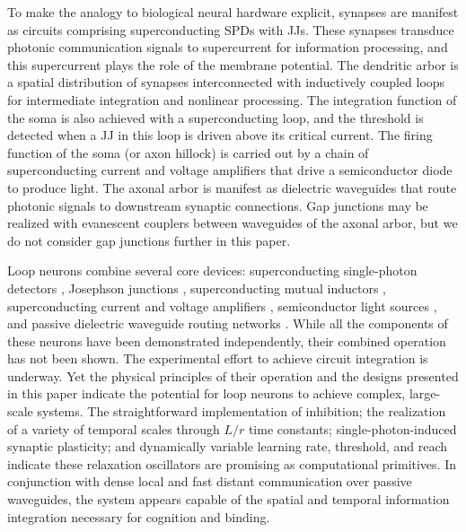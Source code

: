 \documentclass[aip,amsmath,amssymb,reprint,nofootinbib]{revtex4-1}
\begin{document}
To make the analogy to biological neural hardware explicit, synapses are manifest as circuits comprising superconducting SPDs with JJs. These synapses transduce photonic communication signals to supercurrent for information processing, and this supercurrent plays the role of the membrane potential. The dendritic arbor is a spatial distribution of synapses interconnected with inductively coupled loops for intermediate integration and nonlinear processing. The integration function of the soma is also achieved with a superconducting loop, and the threshold is detected when a JJ in this loop is driven above its critical current. The firing function of the soma (or axon hillock) is carried out by a chain of superconducting current and voltage amplifiers that drive a semiconductor diode to produce light. The axonal arbor is manifest as dielectric waveguides that route photonic signals to downstream synaptic connections. Gap junctions may be realized with evanescent couplers between waveguides of the axonal arbor, but we do not consider gap junctions further in this paper.

Loop neurons combine several core devices: superconducting single-photon detectors \cite{gook2001,nata2012,liyo2013,mave2013}, Josephson junctions \cite{ti1996,vatu1998,ka1999}, superconducting mutual inductors \cite{miha2005}, superconducting current \cite{mcbe2014,mcab2016} and voltage amplifiers \cite{zhto2018}, semiconductor light sources \cite{shbu2017,buch2017}, and passive dielectric waveguide routing networks \cite{chbu2017,sami2017,chbu2018}. While all the components of these neurons have been demonstrated independently, their combined operation has not been shown. The experimental effort to achieve circuit integration is underway. Yet the physical principles of their operation and the designs presented in this paper indicate the potential for loop neurons to achieve complex, large-scale systems. The straightforward implementation of inhibition; the realization of a variety of temporal scales through $L/r$ time constants; single-photon-induced synaptic plasticity; and dynamically variable learning rate, threshold, and reach indicate these relaxation oscillators are promising as computational primitives. In conjunction with dense local and fast distant communication over passive waveguides, the system appears capable of the spatial and temporal information integration necessary for cognition and binding. 
	
\end{document}
